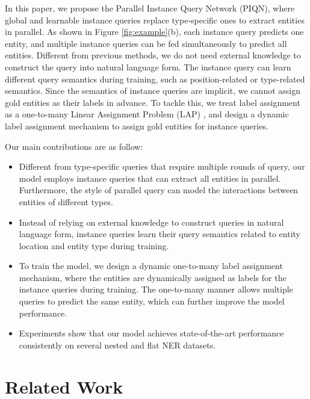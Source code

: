 \documentclass[11pt]{article}
\begin{document}
In this paper, we propose the Parallel Instance Query Network (PIQN), where global and learnable instance queries replace type-specific ones to extract entities in parallel. As shown in Figure \ref{fig:example}(b), each instance query predicts one entity, and multiple instance queries can be fed simultaneously to predict all entities. Different from previous methods, we do not need external knowledge to construct the query into natural language form. The instance query can learn different query semantics during training, such as position-related or type-related semantics.
Since the semantics of instance queries are implicit, we cannot assign gold entities as their labels in advance. To tackle this, we treat label assignment as a one-to-many Linear Assignment Problem (LAP)
\citep{Burkard1999LinearAP},
and design a dynamic label assignment mechanism to assign gold entities for instance queries.

Our main contributions are as follow:

\begin{itemize}
\item Different from type-specific queries that require multiple rounds of query, our model employs instance queries that can extract all entities in parallel. Furthermore, the style of parallel query can model the interactions between entities of different types.
    \item Instead of relying on external knowledge to construct queries in natural language form, instance queries learn their query semantics related to entity location and entity type during training.
\item 
To train the model,
    we design a dynamic one-to-many label assignment mechanism,
where the entities are dynamically assigned as labels for the instance queries during training.
    The one-to-many manner allows multiple queries to predict the same entity, which can further improve the model performance.
\item Experiments show that our model achieves state-of-the-art performance consistently on several nested and flat NER datasets.
\end{itemize}




\section{Related Work}
\end{document}
